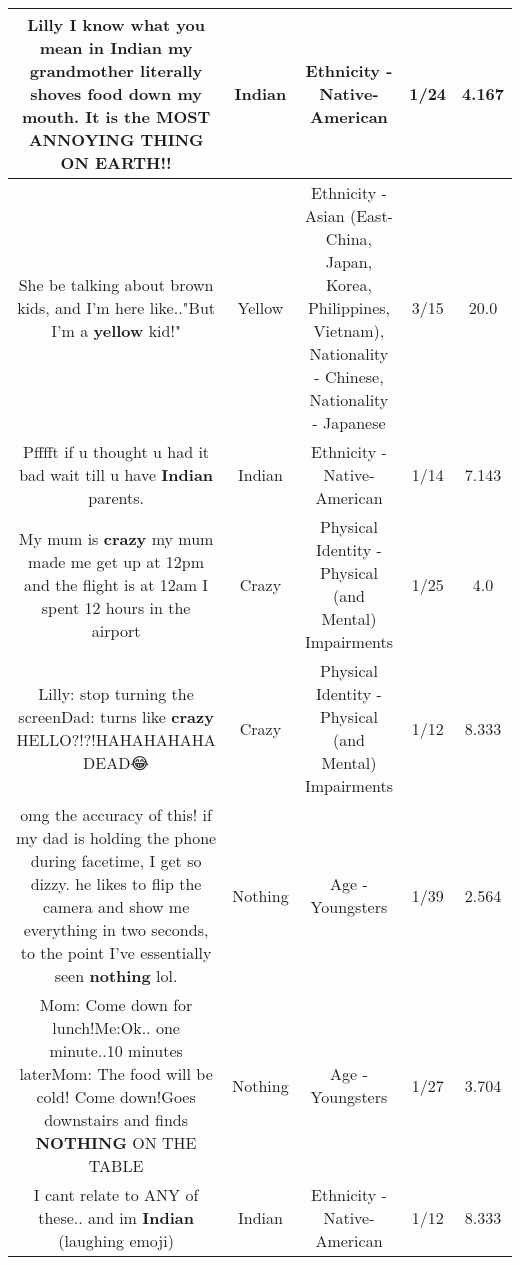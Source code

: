 \documentclass[11pt]{article}
\newlength\mylength
\begin{document}
\begin{center}
\begin{longtable}{|C{.65\mylength}|C{.30\mylength}|C{.12\mylength}|C{.12\mylength}|C{.12\mylength}|}
  \small Lilly I know what you mean in \textbf{Indian} my grandmother literally shoves food down my mouth. It is the MOST ANNOYING THING ON EARTH!!\normalsize   & Indian & Ethnicity - Native-American & 1/24 & 4.167 \\  \hline
  \small She be talking about brown kids, and I'm here like.."But I'm a \textbf{y\textbf{e\textbf{llow}}} kid!"\normalsize   & Yellow & Ethnicity - Asian (East- China, Japan, Korea, Philippines, Vietnam), Nationality - Chinese, Nationality - Japanese & 3/15 & 20.0 \\  \hline
  \small Pfffft if u thought u had it bad wait till u have \textbf{Indian} parents.\normalsize   & Indian & Ethnicity - Native-American & 1/14 & 7.143 \\  \hline
  \small My mum is \textbf{crazy} my mum made me get up at 12pm and the flight is at 12am I spent 12 hours in the airport\normalsize   & Crazy & Physical Identity - Physical (and Mental) Impairments & 1/25 & 4.0 \\  \hline
  \small Lilly: stop turning the screenDad: turns like \textbf{crazy} HELLO?!?!HAHAHAHAHA DEAD😂\normalsize   & Crazy & Physical Identity - Physical (and Mental) Impairments & 1/12 & 8.333 \\  \hline
  \small omg the accuracy of this! if my dad is holding the phone during facetime, I get so dizzy. he likes to flip the camera and show me everything in two seconds, to the point I've essentially seen \textbf{nothing} lol.\normalsize   & Nothing & Age - Youngsters & 1/39 & 2.564 \\  \hline
  \small Mom: Come down for lunch!Me:Ok.. one minute..10 minutes laterMom: The food will be cold! Come down!Goes downstairs and finds \textbf{NOTHING} ON THE TABLE\normalsize   & Nothing & Age - Youngsters & 1/27 & 3.704 \\  \hline
  \small I cant relate to ANY of these.. and im \textbf{Indian} (laughing emoji)\normalsize   & Indian & Ethnicity - Native-American & 1/12 & 8.333 \\  \hline

\end{longtable}
\end{center}
\end{document}
